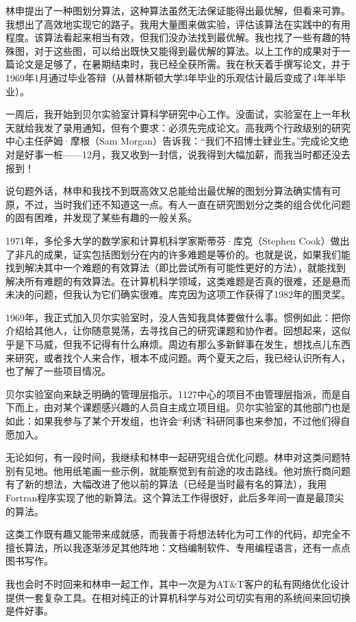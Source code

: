 \documentclass[a4paper,12pt,UTF8,twoside]{ctexbook}
\begin{document}
林申提出了一种图划分算法，这种算法虽然无法保证能得出最优解，但看来可靠。我想出了高效地实现它的路子。我用大量图来做实验，评估该算法在实践中的有用程度。该算法看起来相当有效，但我们没办法找到最优解。我也找了一些有趣的特殊图，对于这些图，可以给出既快又能得到最优解的算法。以上工作的成果对于一篇论文是足够了，在暑期结束时，我已经全获所需。我在秋天着手撰写论文，并于1969年1月通过毕业答辩（从普林斯顿大学3年毕业的乐观估计最后变成了4年半毕业）。

一周后，我开始到贝尔实验室计算科学研究中心工作。没面试，实验室在上一年秋天就给我发了录用通知，但有个要求：必须先完成论文。高我两个行政级别的研究中心主任萨姆·摩根（Sam Morgan）告诉我：“我们不招博士肄业生。”完成论文绝对是好事一桩——12月，我又收到一封信，说我得到大幅加薪，而我当时都还没去报到！

说句题外话，林申和我找不到既高效又总能给出最优解的图划分算法确实情有可原，不过，当时我们还不知道这一点。有人一直在研究图划分之类的组合优化问题的固有困难，并发现了某些有趣的一般关系。

1971年，多伦多大学的数学家和计算机科学家斯蒂芬·库克（Stephen Cook）做出了非凡的成果，证实包括图划分在内的许多难题是等价的。也就是说，如果我们能找到解决其中一个难题的有效算法（即比尝试所有可能性更好的方法），就能找到解决所有难题的有效算法。在计算机科学领域，这类难题是否真的很难，还是悬而未决的问题，但我认为它们确实很难。库克因为这项工作获得了1982年的图灵奖。

1969年，我正式加入贝尔实验室时，没人告知我具体要做什么事。惯例如此：把你介绍给其他人，让你随意晃荡，去寻找自己的研究课题和协作者。回想起来，这似乎是下马威，但我不记得有什么麻烦。周边有那么多新鲜事在发生，想找点儿东西来研究，或者找个人来合作，根本不成问题。两个夏天之后，我已经认识所有人，也了解了一些项目情况。

贝尔实验室向来缺乏明确的管理层指示。1127中心的项目不由管理层指派，而是自下而上，由对某个课题感兴趣的人员自主成立项目组。贝尔实验室的其他部门也是如此：如果我参与了某个开发组，也许会“利诱”科研同事也来参加，不过他们得自愿加入。

无论如何，有一段时间，我继续和林申一起研究组合优化问题。林申对这类问题特别有见地。他用纸笔画一些示例，就能察觉到有前途的攻击路线。他对旅行商问题有了新的想法，大幅改进了他以前的算法（已经是当时最有名的算法），我用Fortran程序实现了他的新算法。这个算法工作得很好，此后多年间一直是最顶尖的算法。

这类工作既有趣又能带来成就感，而我善于将想法转化为可工作的代码，却完全不擅长算法，所以我逐渐涉足其他阵地：文档编制软件、专用编程语言，还有一点点图书写作。

我也会时不时回来和林申一起工作，其中一次是为AT\&T客户的私有网络优化设计提供一套复杂工具。在相对纯正的计算机科学与对公司切实有用的系统间来回切换是件好事。
\end{document}
